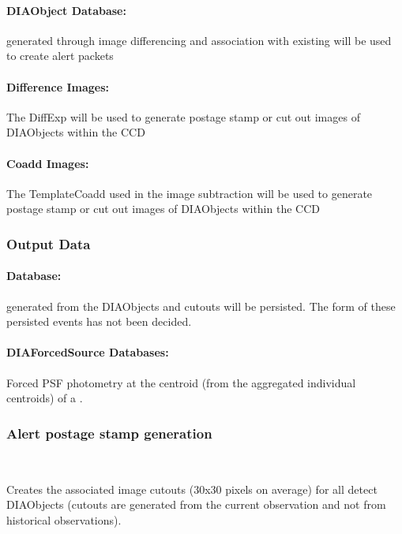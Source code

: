 \paragraph*{DIAObject Database:} \DIAObjects generated through image differencing and association with existing \DIAObjects will be used to create alert packets 

\paragraph{Difference Images:} The DiffExp will be used to  generate postage stamp or cut out images of DIAObjects within the CCD 

\paragraph{Coadd Images:} The TemplateCoadd used in the image subtraction will be used to  generate postage stamp or cut out images of DIAObjects   within the CCD


\subsubsection{Output Data}

\paragraph{\VOEvent Database:} \VOEvents generated from the DIAObjects and cutouts will be persisted. The form of these persisted events has not been decided.

\paragraph*{DIAForcedSource Databases:} Forced PSF photometry at the centroid (from the aggregated individual \DIASource centroids) of a \DIAObject.



\subsubsection{Alert postage stamp generation}~

Creates the associated image cutouts (30x30 pixels on average) for all detect DIAObjects (cutouts are generated from the current observation and not from historical observations).

